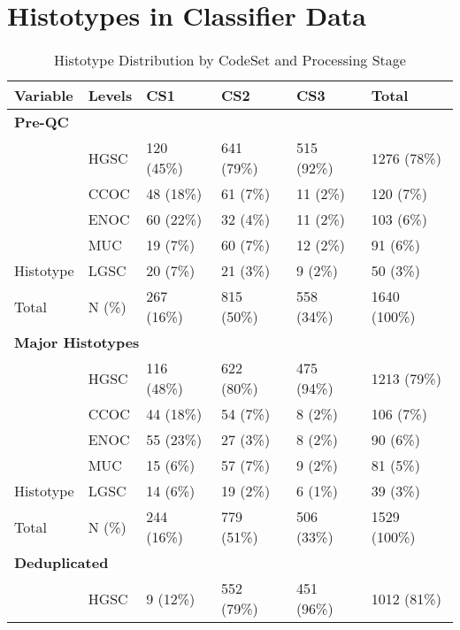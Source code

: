 \documentclass[
]{report}
\begin{document}
\section{Histotypes in Classifier Data}\label{histotypes-in-classifier-data}

\begin{table}

\caption{\label{tab:hist-codeset}Histotype Distribution by CodeSet and Processing Stage}
\centering
\begin{tabular}[t]{l|l|l|l|l|l}
\hline
Variable & Levels & CS1 & CS2 & CS3 & Total\\
\hline
\multicolumn{6}{l}{\textbf{Pre-QC}}\\
\hline
 & HGSC & 120 (45\%) & 641 (79\%) & 515 (92\%) & 1276 (78\%)\\
\cline{2-6}
 & CCOC & 48 (18\%) & 61 (7\%) & 11 (2\%) & 120 (7\%)\\
\cline{2-6}
 & ENOC & 60 (22\%) & 32 (4\%) & 11 (2\%) & 103 (6\%)\\
\cline{2-6}
 & MUC & 19 (7\%) & 60 (7\%) & 12 (2\%) & 91 (6\%)\\
\cline{2-6}
\multirow{-5}{*}{\raggedright\arraybackslash \hspace{1em}Histotype} & LGSC & 20 (7\%) & 21 (3\%) & 9 (2\%) & 50 (3\%)\\
\cline{1-6}
\hspace{1em}Total & N (\%) & 267 (16\%) & 815 (50\%) & 558 (34\%) & 1640 (100\%)\\
\cline{1-6}
\multicolumn{6}{l}{\textbf{Major Histotypes}}\\
\hline
 & HGSC & 116 (48\%) & 622 (80\%) & 475 (94\%) & 1213 (79\%)\\
\cline{2-6}
 & CCOC & 44 (18\%) & 54 (7\%) & 8 (2\%) & 106 (7\%)\\
\cline{2-6}
 & ENOC & 55 (23\%) & 27 (3\%) & 8 (2\%) & 90 (6\%)\\
\cline{2-6}
 & MUC & 15 (6\%) & 57 (7\%) & 9 (2\%) & 81 (5\%)\\
\cline{2-6}
\multirow{-5}{*}{\raggedright\arraybackslash \hspace{1em}Histotype} & LGSC & 14 (6\%) & 19 (2\%) & 6 (1\%) & 39 (3\%)\\
\cline{1-6}
\hspace{1em}Total & N (\%) & 244 (16\%) & 779 (51\%) & 506 (33\%) & 1529 (100\%)\\
\cline{1-6}
\multicolumn{6}{l}{\textbf{Deduplicated}}\\
\hline
 & HGSC & 9 (12\%) & 552 (79\%) & 451 (96\%) & 1012 (81\%)\\

\end{tabular}
\end{table}
\end{document}
